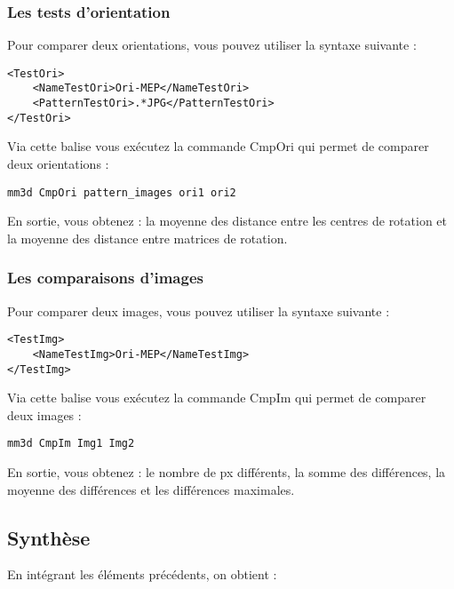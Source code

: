 \documentclass[a4paper]{book}
\begin{document}
\subsubsection{Les tests d’orientation}
Pour comparer deux orientations, vous pouvez utiliser la syntaxe suivante :

\begin{verbatim}
<TestOri> 
	<NameTestOri>Ori-MEP</NameTestOri>
	<PatternTestOri>.*JPG</PatternTestOri>
</TestOri>
\end{verbatim}

Via cette balise vous ex\'ecutez la commande CmpOri qui permet de comparer deux orientations :
\begin{verbatim}
mm3d CmpOri pattern_images ori1 ori2
\end{verbatim}
En sortie, vous obtenez : la moyenne des distance entre les centres de rotation et la moyenne des distance entre matrices de rotation.

\subsubsection{Les comparaisons d’images}
Pour comparer deux images, vous pouvez utiliser la syntaxe suivante :

\begin{verbatim}
<TestImg> 
	<NameTestImg>Ori-MEP</NameTestImg>
</TestImg>
\end{verbatim}

Via cette balise vous ex\'ecutez la commande CmpIm qui permet de comparer deux images :
\begin{verbatim}
mm3d CmpIm Img1 Img2
\end{verbatim}
En sortie, vous obtenez : le nombre de px diff\'erents, la somme des diff\'erences, la moyenne des diff\'erences et les diff\'erences maximales.

\subsection{Synthèse}
En int\'egrant les \'el\'ements pr\'ec\'edents, on obtient :
\end{document}
